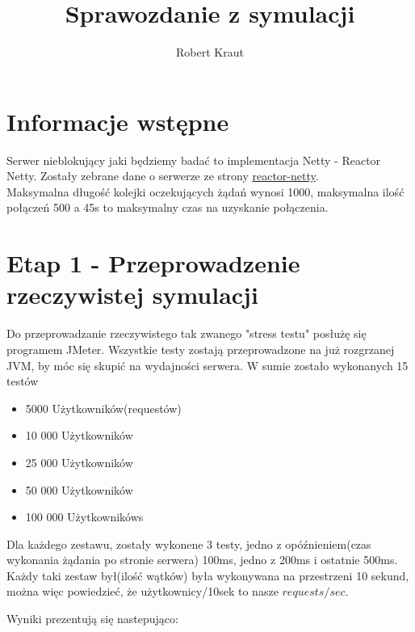 \documentclass{article}
\title{Sprawozdanie z symulacji}
\author{Robert Kraut}
\begin{document}
    \maketitle


    \section{Informacje wstępne}
    Serwer nieblokujący jaki będziemy badać to implementacja Netty - Reactor Netty.
    Zostały zebrane dane o serwerze ze strony \href{https://projectreactor.io/docs/netty/release/reference/index.html}{reactor-netty}. \\
    Maksymalna długość kolejki oczekujących żądań wynosi 1000, maksymalna ilość połączeń 500 a 45s
    to maksymalny czas na uzyskanie połączenia.


    \section{Etap 1 - Przeprowadzenie rzeczywistej symulacji}
    Do przeprowadzanie rzeczywistego tak zwanego "stress testu" posłużę się programem JMeter. \newline
    Wszystkie testy zostają przeprowadzone na już rozgrzanej JVM, by móc się skupić na wydajności serwera. \newline
    W sumie zostało wykonanych 15 testów
    \begin{itemize}
        \item 5000 Użytkowników(requestów)
        \item 10 000 Użytkowników
        \item 25 000 Użytkowników
        \item 50 000 Użytkowników
        \item 100 000 Użytkownikóws
    \end{itemize}
    Dla każdego zestawu, zostały wykonene 3 testy, jedno z opóźnieniem(czas wykonania żądania po stronie serwera) \newline
    100ms, jedno z 200ms i ostatnie 500ms.
    Każdy taki zestaw był(ilość wątków) była wykonywana na przestrzeni 10 sekund, można więc powiedzieć, że \newline
    użytkownicy/10sek to nasze \(requests/sec\).

    Wyniki prezentują się nastepująco:
\end{document}
